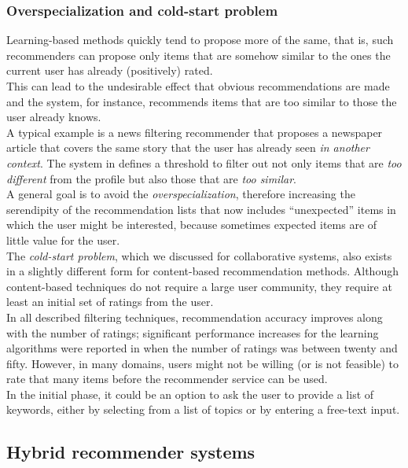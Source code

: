 \subsubsection{Overspecialization and cold-start problem}\label{overspecialization}

Learning-based methods quickly tend to propose more of the same, that
is, such recommenders can propose only items that are somehow similar
to the ones the current user has already (positively) rated. \\ This can
lead to the undesirable effect that obvious recommendations are made
and the system, for instance, recommends items that are too similar to
those the user already knows.\\ A typical example is a news filtering
recommender that proposes a newspaper article that covers the same
story that the user has already seen \textit{in another context}. The
system in \cite{billsus1999personal} defines a threshold to filter
out not only items that are \textit{too different} from the profile
but also those that are \textit{too similar}. \\A general goal is to
avoid the \textit{overspecialization}, therefore increasing the
serendipity of the recommendation lists that now includes “unexpected”
items in which the user might be interested, because sometimes
expected items are of little value for the user.\\ 
The  \textit{cold-start problem}, 
which we discussed for collaborative systems,  also
exists in a slightly different form for content-based recommendation
methods. Although content-based techniques do not require a large user
community, they require at least an initial set of ratings from the
user. \\ In all described filtering techniques, recommendation
accuracy improves along with the number of ratings; significant
performance increases for the learning algorithms were reported in
 \cite{pazzani1997learning}   when the number of ratings was between
twenty and fifty. However, in many domains, users might not be
willing (or is not feasible) to rate that many items before the
recommender  service can be used. \\In the initial phase, it could be an
option to ask  the user to provide a list of keywords, either by
selecting from a  list of topics or by entering a free-text input.

\subsection{Hybrid recommender systems} 

